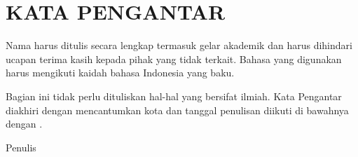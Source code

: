 \chapter*{KATA PENGANTAR}

Nama harus ditulis secara lengkap termasuk gelar akademik dan
harus dihindari ucapan terima kasih kepada pihak yang tidak
terkait. Bahasa yang digunakan harus mengikuti kaidah bahasa
Indonesia yang baku.

\noindent
Bagian ini tidak perlu dituliskan hal-hal yang bersifat ilmiah.
Kata Pengantar diakhiri dengan mencantumkan kota dan tanggal
penulisan diikuti di bawahnya dengan
.

\vspace{0.8em}
\noindent
\TanggalKataPengantar

\vspace{0.6em}
\noindent
Penulis

\clearpage
